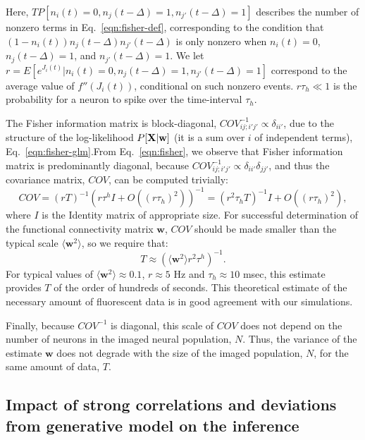 \documentclass[aoas,preprint]{imsart}
\newcommand{\w}{w}
\newcommand{\bw}{\mathbf{\w}}
\newcommand{\bX}{{\bf X}}
\begin{document}
Here, $TP[n_i(t)=0, n_j(t-\Delta)=1, n_{j'}(t-\Delta)=1]$ describes the number of nonzero
terms in Eq.~\eqref{eqn:fisher-def}, corresponding to the condition that
$(1-n_i(t))n_{j}(t-\Delta)n_{j'}(t-\Delta)$ is only nonzero when 
$n_i(t)=0$, $n_j(t-\Delta)=1$, and $n_{j'}(t-\Delta)=1$.  We let $r=E[e^{J_i(t)}|n_i(t)=0, n_j(t-\Delta)=1, n_{j'}(t-\Delta)=1]$  correspond to the average value of $f''(J_i(t))$, conditional on such nonzero events.  $r\tau_h \ll 1$ is the probability for a neuron to spike over the time-interval $\tau_h$.

The Fisher information matrix is block-diagonal, $COV^{-1}_{ij;i'j'} \propto \delta_{ii'}$, due to the structure of the log-likelihood $P[\bX | \bw]$ (it is a sum over $i$ of independent terms), Eq.~\eqref{eqn:fisher-glm}.From Eq.~\eqref{eqn:fisher}, we observe that Fisher information matrix is predominantly diagonal, because $COV^{-1}_{ij;i'j'} \propto \delta_{ii'}\delta_{jj'}$, and thus the covariance matrix, $COV$, can be computed trivially:
\begin{equation}
COV = (rT)^{-1} (r \tau^h I + O((r \tau_h)^2))^{-1} = (r^2 \tau_h T)^{-1} I + O((r \tau_h)^2),
\end{equation}
\noindent where $I$ is the Identity matrix of appropriate size.  For successful determination of the functional connectivity matrix $\bw$, $COV$ should be made smaller than the typical scale $\langle \bw^2\rangle$, so we require that:
\begin{equation}
T \approx (\langle \bw^2 \rangle r^2  \tau^h)^{-1}.
\end{equation}
For typical values of $\langle\bw^2\rangle\approx 0.1$, $r\approx 5$ Hz and $ \tau_h \approx 10$ msec, this estimate provides $T$ of the order of hundreds of seconds. This theoretical estimate of the necessary amount of fluorescent data is in good agreement with our simulations.

Finally, because $COV^{-1}$ is diagonal, this scale of $COV$ does not depend on the number of neurons in the imaged neural population, $N$. Thus, the variance of the estimate $\bw$ does not degrade with the size of the imaged population, $N$, for the same amount of data, $T$.

\subsection{Impact of strong correlations and deviations from generative model on the inference}
\end{document}
